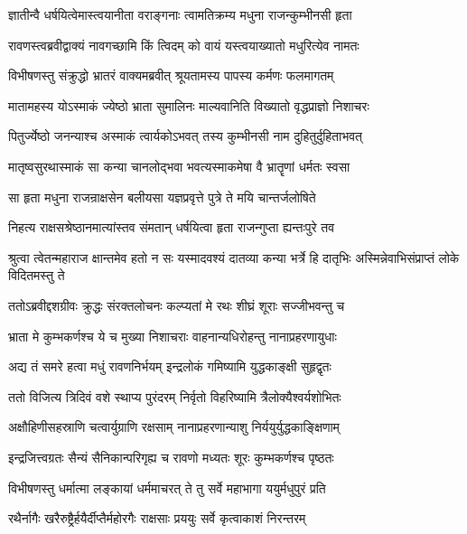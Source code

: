 \twolineshloka
{ज्ञातीन्वै धर्षयित्वेमास्त्वयानीता वराङ्गनाः}
{त्वामतिक्रम्य मधुना राजन्कुम्भीनसी हृता} %

\twolineshloka
{रावणस्त्वब्रवीद्वाक्यं नावगच्छामि किं त्विदम्}
{को वायं यस्त्वयाख्यातो मधुरित्येव नामतः} %

\twolineshloka
{विभीषणस्तु संक्रुद्धो भ्रातरं वाक्यमब्रवीत्}
{श्रूयतामस्य पापस्य कर्मणः फलमागतम्} %

\twolineshloka
{मातामहस्य योऽस्माकं ज्येष्ठो भ्राता सुमालिनः}
{माल्यवानिति विख्यातो वृद्धप्राज्ञो निशाचरः} %

\twolineshloka
{पितुर्ज्येष्ठो जनन्याश्च अस्माकं त्वार्यकोऽभवत्}
{तस्य कुम्भीनसी नाम दुहितुर्दुहिताभवत्} %

\twolineshloka
{मातृष्वसुरथास्माकं सा कन्या चानलोद्भवा}
{भवत्यस्माकमेषा वै भ्रातॄणां धर्मतः स्वसा} %

\twolineshloka
{सा हृता मधुना राजन्राक्षसेन बलीयसा}
{यज्ञप्रवृत्ते पुत्रे ते मयि चान्तर्जलोषिते} %

\twolineshloka
{निहत्य राक्षसश्रेष्ठानमात्यांस्तव संमतान्}
{धर्षयित्वा हृता राजन्गुप्ता ह्यन्तःपुरे तव} %

\threelineshloka
{श्रुत्वा त्वेतन्महाराज क्षान्तमेव हतो न सः}
{यस्मादवश्यं दातव्या कन्या भर्त्रे हि दातृभिः}
{अस्मिन्नेवाभिसंप्राप्तं लोके विदितमस्तु ते} %

\twolineshloka
{ततोऽब्रवीद्दशग्रीवः क्रुद्धः संरक्तलोचनः}
{कल्प्यतां मे रथः शीघ्रं शूराः सज्जीभवन्तु च} %

\twolineshloka
{भ्राता मे कुम्भकर्णश्च ये च मुख्या निशाचराः}
{वाहनान्यधिरोहन्तु नानाप्रहरणायुधाः} %

\twolineshloka
{अद्य तं समरे हत्वा मधुं रावणनिर्भयम्}
{इन्द्रलोकं गमिष्यामि युद्धकाङ्क्षी सुहृद्वृतः} %

\twolineshloka
{ततो विजित्य त्रिदिवं वशे स्थाप्य पुरंदरम्}
{निर्वृतो विहरिष्यामि त्रैलोक्यैश्वर्यशोभितः} %

\twolineshloka
{अक्षौहिणीसहस्राणि चत्वार्युग्राणि रक्षसाम्}
{नानाप्रहरणान्याशु निर्ययुर्युद्धकाङ्क्षिणाम्} %

\twolineshloka
{इन्द्रजित्त्वग्रतः सैन्यं सैनिकान्परिगृह्य च}
{रावणो मध्यतः शूरः कुम्भकर्णश्च पृष्ठतः} %

\twolineshloka
{विभीषणस्तु धर्मात्मा लङ्कायां धर्ममाचरत्}
{ते तु सर्वे महाभागा ययुर्मधुपुरं प्रति} %

\twolineshloka
{रथैर्नागैः खरैरुष्ट्रैर्हयैर्दीप्तैर्महोरगैः}
{राक्षसाः प्रययुः सर्वे कृत्वाकाशं निरन्तरम्} %

